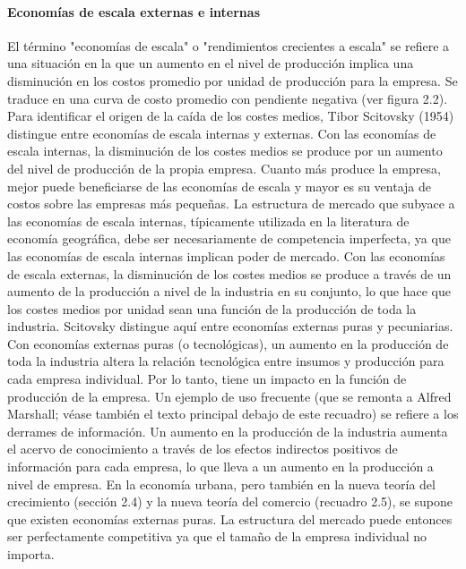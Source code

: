 \paragraph{Economías de escala externas e internas}
El término "economías de escala" o "rendimientos crecientes a escala" se refiere a una situación en la que un aumento en el nivel de producción implica una disminución en los costos promedio por unidad de producción para la empresa. Se traduce en una curva de costo promedio con pendiente negativa (ver figura 2.2). Para identificar el origen de la caída de los costes medios, Tibor Scitovsky (1954) distingue entre economías de escala internas y externas. Con las economías de escala internas, la disminución de los costes medios se produce por un aumento del nivel de producción de la propia empresa. Cuanto más produce la empresa, mejor puede beneficiarse de las economías de escala y mayor es su ventaja de costos sobre las empresas más pequeñas. La estructura de mercado que subyace a las economías de escala internas, típicamente utilizada en la literatura de economía geográfica, debe ser necesariamente de competencia imperfecta, ya que las economías de escala internas implican poder de mercado. Con las economías de escala externas, la disminución de los costes medios se produce a través de un aumento de la producción a nivel de la industria en su conjunto, lo que hace que los costes medios por unidad sean una función de la producción de toda la industria. Scitovsky distingue aquí entre economías externas puras y pecuniarias.\\
Con economías externas puras (o tecnológicas), un aumento en la producción de toda la industria altera la relación tecnológica entre insumos y producción para cada empresa individual. Por lo tanto, tiene un impacto en la función de producción de la empresa. Un ejemplo de uso frecuente (que se remonta a Alfred Marshall; véase también el texto principal debajo de este recuadro) se refiere a los derrames de información. Un aumento en la producción de la industria aumenta el acervo de conocimiento a través de los efectos indirectos positivos de información para cada empresa, lo que lleva a un aumento en la producción a nivel de empresa. En la economía urbana, pero también en la nueva teoría del crecimiento (sección 2.4) y la nueva teoría del comercio (recuadro 2.5), se supone que existen economías externas puras. La estructura del mercado puede entonces ser perfectamente competitiva ya que el tamaño de la empresa individual no importa.\\


